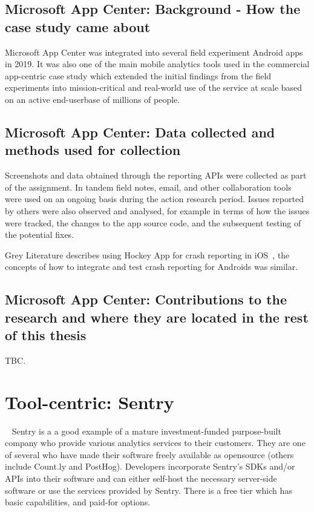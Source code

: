 \subsection{Microsoft App Center: Background - How the case study came about}
Microsoft App Center was integrated into several field experiment Android apps in 2019. It was also one of the main mobile analytics tools used in the commercial app-centric case study which extended the initial findings from the field experiments into mission-critical and real-world use of the service at scale based on an active end-userbase of millions of people.

\subsection{Microsoft App Center: Data collected and methods used for collection}
Screenshots and data obtained through the reporting APIs were collected as part of the assignment. In tandem field notes, email, and other collaboration tools were used on an ongoing basis during the action research period. Issues reported by others were also observed and analysed, for example in terms of how the issues were tracked, the changes to the app source code, and the subsequent testing of the potential fixes.

Grey Literature describes using Hockey App for crash reporting in iOS~, the concepts of how to integrate and test crash reporting for Androids was similar.

\subsection{Microsoft App Center: Contributions to the research and where they are located in the rest of this thesis}
TBC.




\section{Tool-centric: Sentry}~\label{case-study-overview-sentry}
Sentry is a a good example of a mature investment-funded purpose-built company who provide various analytics services to their customers. They are one of several who have made their software freely available as opensource (others include Count.ly and PostHog). Developers incorporate Sentry's SDKs and/or APIs into their software and can either self-host the necessary server-side software or use the services provided by Sentry. There is a free tier which has basic capabilities, and paid-for options.

